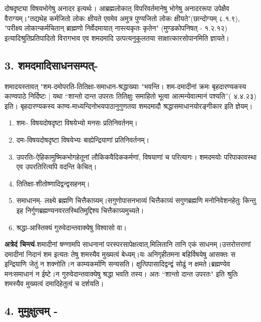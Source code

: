 {दोषदृष्ट्या विषयभोगेषु अनादर इत्यर्थः। आब्रह्मलोकात् विपरिवर्तमानेषु भोगेषु अनादररूपा उपेक्षैव वैराग्यम्।"तद्यथेह कर्मजितो लोकः क्षीयते एवमेव अमुत्र पुण्यजितो लोकः क्षीयते"(छान्दोग्यम् ८.१.९), "परीक्ष्य लोकान्कर्मचितान् ब्राह्मणो निर्वेदमायात् नास्त्यकृतः कृतेन" (मुण्डकोपनिषत् - १.२.१२) इत्यादिश्रुतिप्रतिपादितो विरागभाव एव शमदमादि उत्पत्यनुकूलतया साक्षात्कारसोपानमिति ज्ञायते।

\subsection*{3. शमदमादिसाधनसम्पत्-}

शमादयस्तावत् "शम-दमोपरति-तितिक्षा-समाधान-श्रद्धाख्याः "भवन्ति। शम-दमादीनां क्रमः बृहदारण्यकस्य काण्वपाठे निर्दिष्टः | यथा “शान्तो दान्त उपरतः तितिक्षुः समाहितो भूत्वा आत्मन्येवात्मानं पश्यति”( ४.४.२३) इति। बृहदारण्यकस्य काण्व-माध्यन्दिनोभयपाठानुगुणतया शमदमादौ श्रद्धासमाधानयोरङ्गीकार इति ज्ञेयम्।

\begin{enumerate}	
\item शमः- विषयदोषदृष्टा 	विषयेभ्यो 	मनसः 	प्रतिनिवर्तनम्।
\item दमः-विषयदोषदृष्टा 	विषयेभ्यः 	बाह्येन्द्रियाणां 	प्रतिनिवर्तनम्।
\item उपरतिः-ऐहिकामुष्मिकभोगहेतूनां 	लौकिकवैदिककर्मणां, 	विषयाणां 	च   परित्यागः। शमदमयोः 	परिपाकावस्था 	एव 	उपरतिरित्यपि 	वदन्ति केचित्।
\item तितिक्षा-शीतोष्णादिद्वन्द्वसहनम्।
\item समाधानम्- लक्ष्ये ब्रह्मणि चित्तैकाग्र्यम्।सगुणोपासनभाव्यं चित्तैकाग्र्यं 	 सगुणब्रह्मणि मनोनिवेशनहेतुः किन्तु 	इह निर्गुणब्रह्मण्यनवरतस्थितिमुद्दिश्य 	चित्तैकाग्र्यमुच्यते।
\item श्रद्धा-आस्तिक्यं गुरुवेदान्तवाक्येषु विश्वासो वा।
\end{enumerate}

\textbf{अत्रेदं चिन्त्यं}-शमादीनां षण्णामपि साधनानां परस्परसापेक्षत्वात्,मिलितानि तानि एकं साधनम्।उत्तरोत्तराणां दमादीनां निदानं शम इत्यतः तेषु शमस्यैव मुख्यत्वं बेध्यम्।यः अनिगृहीतमना बहिर्विषयेषु आसक्तः स इन्द्रियाणि जेतुं न शक्नोति।न काम्यकर्माणि सन्यसति। क्षुत्पिपासादिद्वन्द्वं सोढुं न क्षमते।ब्रह्मण्येव मनःसमाधानं न ईष्टे।न गुरुवेदान्तवाक्येषु श्रद्धा भवति तस्य। अतः “शान्तो दान्त उपरतः" इति श्रुतिः शमस्यैव मुख्यत्वं दमादिहेतुत्वं च दर्शयति।

\subsection*{4. मुमुक्षुत्वम् -} 

}
